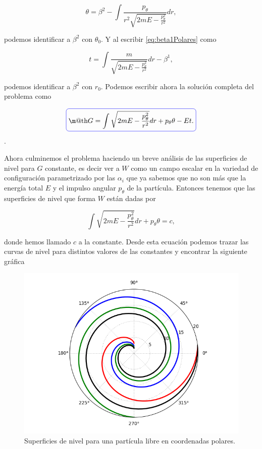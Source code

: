 \documentclass[a4paper,10pt]{article}
\makeatletter
\numberwithin{equation}{section}
\newcommand*{\boxcolor}{blue}
\renewcommand{\boxed}[1]{\textcolor{\boxcolor}{%
\tikz[baseline={([yshift=-1ex]current bounding box.center)}] \node [rectangle, minimum width=1ex,rounded corners,draw] {\normalcolor\m@th$\displaystyle#1$};}}
\makeatother
\begin{document}
\begin{equation}
 \theta =   \beta^2  - \int \frac{p_\theta}{r^2\sqrt{2mE - \frac{p_\theta^2}{r^2}}}dr,
\end{equation}

podemos identificar a $\beta^2$ con $\theta_0$. Y al escribir \eqref{eq:beta1Polares} 
como 

\begin{equation}
 t = \int \frac{m}{\sqrt{2mE - \frac{p_\theta^2}{r^2}}}dr - \beta^1,
\end{equation}

podemos identificar a $\beta^2$ con $r_0$. Podemos escribir ahora la solución 
completa del problema como

\begin{equation}
 \boxed{G = \int \sqrt{2mE - \frac{p_\theta^2}{r^2}} dr + p_\theta\theta - Et.}
\end{equation}.

Ahora culminemos el problema haciendo un breve análisis de las superficies de nivel 
para $G$ constante, es decir ver a $W$ como un campo escalar en la variedad de 
configuración parametrizado por las $\alpha_i$ que ya sabemos que no son más que 
la energía total $E$ y el impulso angular $p_\theta$ de la partícula. Entonces tenemos 
que las superficies de nivel que forma $W$ están dadas por 

\begin{equation}
 \int \sqrt{2mE - \frac{p_\theta^2}{r^2}} dr + p_\theta\theta = c,
\end{equation}

donde hemos llamado $c$ a la constante. Desde esta ecuación podemos trazar las curvas 
de nivel para distintos valores de las constantes y encontrar la siguiente gráfica 

\begin{figure}[H]
 \center 
 \includegraphics[scale=0.5]{problema4fig1}
 \caption{Superficies de nivel para una partícula libre en coordenadas polares.}
 \label{fig:problema4fig1}
\end{figure}
\end{document}
